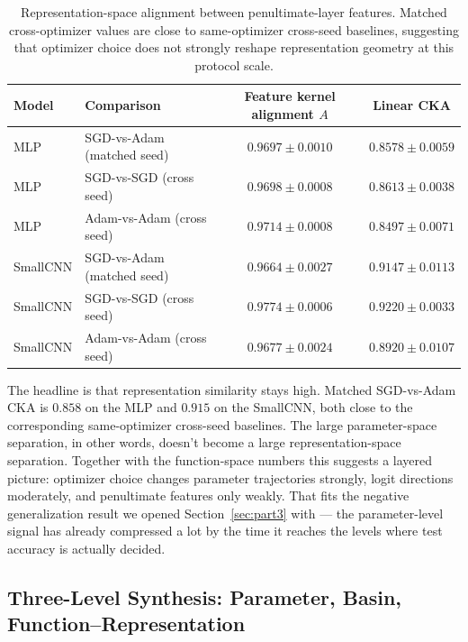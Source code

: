 \documentclass[11pt]{article}
\begin{document}
\begin{table}[H]
\centering
\small
\begin{tabular}{llcc}
\toprule
\textbf{Model} & \textbf{Comparison} & \textbf{Feature kernel alignment $A$} & \textbf{Linear CKA} \\
\midrule
MLP      & SGD-vs-Adam (matched seed) & $0.9697 \pm 0.0010$ & $0.8578 \pm 0.0059$ \\
MLP      & SGD-vs-SGD (cross seed)    & $0.9698 \pm 0.0008$ & $0.8613 \pm 0.0038$ \\
MLP      & Adam-vs-Adam (cross seed)  & $0.9714 \pm 0.0008$ & $0.8497 \pm 0.0071$ \\
\addlinespace
SmallCNN & SGD-vs-Adam (matched seed) & $0.9664 \pm 0.0027$ & $0.9147 \pm 0.0113$ \\
SmallCNN & SGD-vs-SGD (cross seed)    & $0.9774 \pm 0.0006$ & $0.9220 \pm 0.0033$ \\
SmallCNN & Adam-vs-Adam (cross seed)  & $0.9677 \pm 0.0024$ & $0.8920 \pm 0.0107$ \\
\bottomrule
\end{tabular}
\caption{Representation-space alignment between penultimate-layer features. Matched cross-optimizer values are close to same-optimizer cross-seed baselines, suggesting that optimizer choice does not strongly reshape representation geometry at this protocol scale.}
\label{tab:representation}
\end{table}

The headline is that representation similarity stays high. Matched SGD-vs-Adam CKA is $0.858$ on the MLP and $0.915$ on the SmallCNN, both close to the corresponding same-optimizer cross-seed baselines. The large parameter-space separation, in other words, doesn't become a large representation-space separation. Together with the function-space numbers this suggests a layered picture: optimizer choice changes parameter trajectories strongly, logit directions moderately, and penultimate features only weakly. That fits the negative generalization result we opened Section~\ref{sec:part3} with --- the parameter-level signal has already compressed a lot by the time it reaches the levels where test accuracy is actually decided.

\FloatBarrier

\subsection{Three-Level Synthesis: Parameter, Basin, Function--Representation}
\label{sec:three-level}
\end{document}
